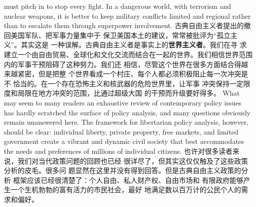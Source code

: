 \begin{paracol}{2}
must pitch in to stop every fight. In a dangerous world, with
terrorism and nuclear weapons, it is better to keep military conflicts limited and regional rather than to escalate them through
superpower involvement.
\switchcolumn
古典自由主义者提出的撤回美国军队、把军事力量集中于
保卫美国本土的建议，常常被批评为“孤立主义”。其实这是
一种误解。古典自由主义者是事实上的\textbf{世界主义者}。我们在寻
求建立一个由自由贸易、全球化和文化交流而结合在一起的世界。我们相信世界范围内的军事干预阻碍了这种努力。我们还
相信，尽管这个世界在很多方面结合得越来越紧密，但是把整
个世界看成一个村庄、每个人都必须积极阻止每一次冲突是不
恰当的。在一个存在恐怖主义和核武器的危险世界里，让军事
冲突保持一定限度和局限在地方冲突的范围，比通过超级大国
的干预而升级要好得多。
\switchcolumn*
What may seem to many readers an exhaustive review of
contemporary policy issues has hardly scratched the surface of
policy analysis, and many questions obviously remain unanswered here. The framework for libertarian policy analysis,
however, should be clear: individual liberty, private property,
free markets, and limited government create a vibrant and dynamic civil society that best accommodates the needs and preferences of millions of individual citizens.
\switchcolumn
也许对很多读者来说，我们对当代政策问题的回顾也已经
很详尽了，但其实这仅仅触及了这些政策分析的皮毛。很多问
题显然在这里并没有得到回答。但是古典自由主义政策的分析
框架应该已经很清楚了：个人自由、私人财产权、自由市场和
有限政府能够产生一个生机勃勃的富有活力的市民社会，最好
地满足数以百万计的公民个人的需求和偏好。

\end{paracol}